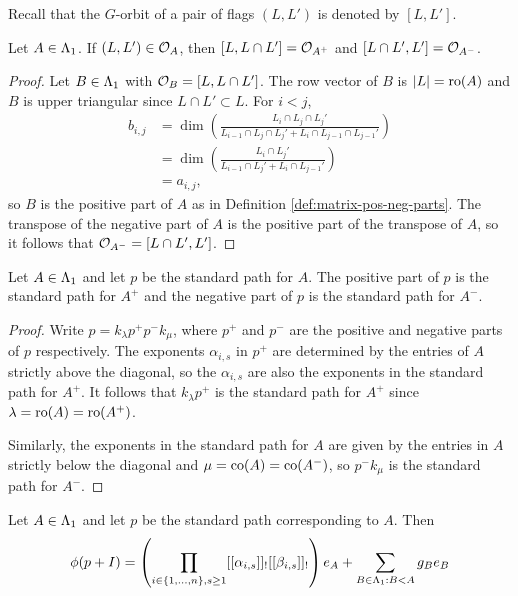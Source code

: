 \documentclass[a4paper, 11pt]{report}
\begin{document}
Recall that the $G$-orbit of a pair of flags $(L,L')$ is denoted by $[L,L']$.

\begin{lemma}\label{lemma:pos-neg-orbits}
Let $A\in\Lambda_1{}$. If $(L,L')\in\mathcal{O}_{A}$, then $[L,L\cap L']=\mathcal{O}_{A^+}$ and $[L\cap L',L']=\mathcal{O}_{A^-}$.
\end{lemma}

\begin{proof}
Let $B\in\Lambda_1{}$ with $\mathcal{O}_{B} = [L,L\cap L']$. The row vector of $B$ is $|L|=\operatorname{ro}(A)$ and $B$ is upper triangular since $L\cap L'\subset L$. For $i<j$,
\begin{align*}
b_{i,j}
&= \dim\left(\frac{L_i\cap L_j\cap L_j'}{L_{i-1}\cap L_j\cap L_j' + L_i\cap L_{j-1}\cap L_{j-1}'}\right)\\
&= \dim\left(\frac{L_i\cap L_j'}{L_{i-1}\cap L_j' + L_i\cap L_{j-1}'}\right)\\
&= a_{i,j},
\end{align*}
so $B$ is the positive part of $A$ as in Definition \ref{def:matrix-pos-neg-parts}. The transpose of the negative part of $A$ is the positive part of the transpose of $A$, so it follows that $\mathcal{O}_{A^-}=[L\cap L',L']$.
\end{proof}

\begin{lemma}\label{lemma:pos-neg-path-to-matrix}
Let $A\in\Lambda_1{}$ and let $p$ be the standard path for $A$. The positive part of $p$ is the standard path for $A^+$ and the negative part of $p$ is the standard path for $A^-$.
\end{lemma}

\begin{proof}
Write $p=k_\lambda p^+ p^-k_\mu$, where $p^+$ and $p^-$ are the positive and negative parts of $p$ respectively. The exponents $\alpha_{i,s}$ in $p^+$ are determined by the entries of $A$ strictly above the diagonal, so the $\alpha_{i,s}$ are also the exponents in the standard path for $A^+$. It follows that $k_\lambda p^+$ is the standard path for $A^+$ since $\lambda=\operatorname{ro}(A)=\operatorname{ro}(A^+)$.

Similarly, the exponents in the standard path for $A$ are given by the entries in $A$ strictly below the diagonal and $\mu=\operatorname{co}(A)=\operatorname{co}(A^-)$, so $p^- k_\mu$ is the standard path for $A^-$.
\end{proof}

\begin{proposition}\label{proposition:image-of-standard-path}
Let $A\in\Lambda_1{}$ and let $p$ be the standard path corresponding to $A$. Then
\begin{equation}
\phi(p+I) = \left(\prod_{i\in\{1,\ldots,n\},s\geq 1} [[\alpha_{i,s}]]_![[\beta_{i,s}]]_!\right) e_A + \sum_{B\in\Lambda_1{}:B<A} g_Be_B \label{eq:image-of-std-path}
\end{equation}
\end{proposition}
\end{document}
